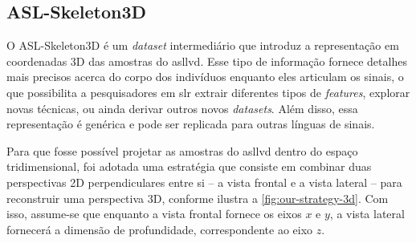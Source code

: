 \subsection{ASL-Skeleton3D}
\label{sec:metodos-datasets-3d}

O ASL-Skeleton3D é um \textit{dataset} intermediário que introduz a representação em coordenadas 3D das amostras do \acrshort{asllvd}. 
Esse tipo de informação fornece detalhes mais precisos acerca do corpo dos indivíduos enquanto eles articulam os sinais, o que possibilita a pesquisadores em \acrshort{slr} extrair diferentes tipos de \textit{features}, explorar novas técnicas, ou ainda derivar outros novos \textit{datasets}.
Além disso, essa representação é genérica e pode ser replicada para outras línguas de sinais.

Para que fosse possível projetar as amostras do \acrshort{asllvd} dentro do espaço tridimensional, foi adotada uma estratégia que consiste em combinar duas perspectivas 2D perpendiculares entre si -- a vista frontal e a vista lateral -- para reconstruir uma perspectiva 3D, conforme ilustra a \autoref{fig:our-strategy-3d}. Com isso, assume-se que enquanto a vista frontal fornece os eixos \(x\) e \(y\), a vista lateral fornecerá a dimensão de profundidade, correspondente ao eixo \( z\).



